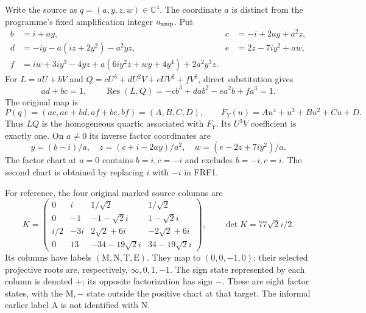 \documentclass[11pt]{article}
\newcommand{\C}{\mathbb C}
\newcommand{\Res}{\operatorname{Res}}
\begin{document}
Write the source as $q=(a,y,z,w)\in\C^4$. The coordinate $a$ is distinct
from the programme's fixed amplification integer $a_{\rm amp}$. Put
\begin{align}
 b&=i+ay,&c&=-i+2ay+a^2z,\nonumber\\
 d&=-iy-a(iz+2y^2)-a^2yz,&e&=2z-7iy^2+aw,\nonumber\\
 f&=iw+3iy^3-4yz+a(6iy^2z+wy+4y^4)+2a^2y^3z.\tag{FRF1}
\end{align}
For $L=aU+bV$ and $Q=cU^3+dU^2V+eUV^2+fV^3$, direct substitution gives
\[
 ad+bc=1,\qquad \Res(L,Q)=-cb^3+dab^2-ea^2b+fa^3=1.
 \tag{FRF2}
\]
The original map is
\[
 P(q)=(ac,ae+bd,af+be,bf)=(A,B,C,D),\qquad
 F_Y(u)=Au^4+u^3+Bu^2+Cu+D.\tag{FRF3}
\]
Thus $LQ$ is the homogeneous quartic associated with $F_Y$. Its $U^3V$
coefficient is exactly one. On $a\ne0$ its inverse factor coordinates are
\[
 y=(b-i)/a,\quad z=(c+i-2ay)/a^2,\quad
 w=(e-2z+7iy^2)/a.\tag{FRF4}
\]
The factor chart at $a=0$ contains $b=i,c=-i$ and excludes $b=-i,c=i$.
The second chart is obtained by replacing $i$ with $-i$ in FRF1.

For reference, the four original marked source columns are
\[
 K=\begin{pmatrix}
0&i&1/\sqrt2&1/\sqrt2\\
0&-1&-1-\sqrt2i&1-\sqrt2i\\
i/2&-3i&2\sqrt2+6i&-2\sqrt2+6i\\
0&13&-34-19\sqrt2i&34-19\sqrt2i
\end{pmatrix},\qquad \det K=77\sqrt2i/2.\tag{FRF5}
\]
Its columns have labels $(\mathrm M,\mathrm N,\mathrm T,\mathrm E)$.
They map to $(0,0,-1,0)$; their selected projective roots are, respectively,
$\infty,0,1,-1$. The sign state represented by each column is denoted $+$;
its opposite factorization has sign $-$. These are eight factor states,
with the $\mathrm M,-$ state outside the positive chart at that target.
The informal earlier label $\mathrm A$ is not identified with $\mathrm N$.
\end{document}
